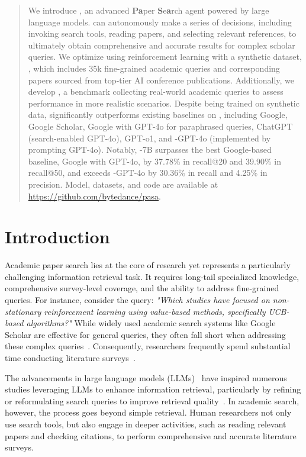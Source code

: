\begin{abstract}
We introduce \pasa, an advanced {\bf Pa}per {\bf S}e{\bf a}rch agent powered by large language models. \pasa can autonomously make a series of decisions, including invoking search tools, reading papers, and selecting relevant references, to ultimately obtain comprehensive and accurate results for complex scholar queries. We optimize \pasa using reinforcement learning with a synthetic dataset, \autoS, which includes 35k fine-grained academic queries and corresponding papers sourced from top-tier AI conference publications. Additionally, we develop \realS, a benchmark collecting real-world academic queries to assess \pasa performance in more realistic scenarios. Despite being trained on synthetic data, \pasa significantly outperforms existing baselines on \realS, including Google, Google Scholar, Google with GPT-4o for paraphrased queries, ChatGPT (search-enabled GPT-4o), GPT-o1, and \pasa-GPT-4o (\pasa implemented by prompting GPT-4o). Notably, \pasa-7B surpasses the best Google-based baseline, Google with GPT-4o, by 37.78\% in recall@20 and 39.90\% in recall@50, and exceeds \pasa-GPT-4o by 30.36\% in recall and 4.25\% in precision. Model, datasets, and code are available at \url{https://github.com/bytedance/pasa}.

\end{abstract}

\section{Introduction}

Academic paper search lies at the core of research yet represents a particularly challenging information retrieval task. It requires long-tail specialized knowledge, comprehensive survey-level coverage, and the ability to address fine-grained queries. For instance, consider the query: \emph{"Which studies have focused on non-stationary reinforcement learning using value-based methods, specifically UCB-based algorithms?"} While widely used academic search systems like Google Scholar are effective for general queries, they often fall short when addressing these complex queries~\cite{gusenbauer2020academic}. Consequently, researchers frequently spend substantial time conducting literature surveys~\cite{kingsley2011not,gusenbauer2021every}.

The advancements in large language models (LLMs)~\cite{openai2023gpt4,anthropic2024claude,team2023gemini,yang2024qwen2} have inspired numerous studies leveraging LLMs to enhance information retrieval, particularly by refining or reformulating search queries to improve retrieval quality~\cite{alaofi2023can,li2023generate,ma2023query,peng2024large}. In academic search, however, the process goes beyond simple retrieval. Human researchers not only use search tools, but also engage in deeper activities, such as reading relevant papers and checking citations, to perform comprehensive and accurate literature surveys.

